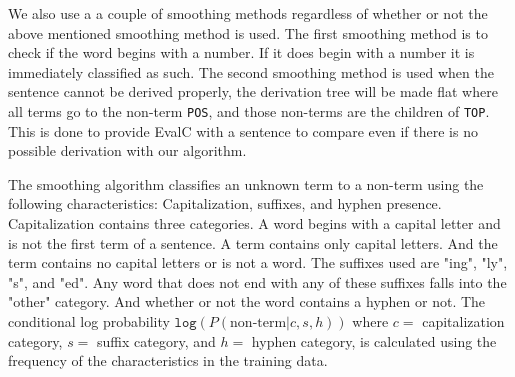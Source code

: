\documentclass[11pt,twocolumn]{article}
\begin{document}
We also use a a couple of smoothing methods regardless of whether or not the above mentioned smoothing method is used. The first smoothing method is to check if the word begins with a number. If it does begin with a number it is immediately classified as such. The second smoothing method is used when the sentence cannot be derived properly, the derivation tree will be made flat where all terms go to the non-term \texttt{POS}, and those non-terms are the children of \texttt{TOP}. This is done to provide EvalC with a sentence to compare even if there is no possible derivation with our algorithm.

The smoothing algorithm classifies an unknown term to a non-term using the following characteristics: Capitalization, suffixes, and hyphen presence. 
Capitalization contains three categories. A word begins with a capital letter and is not the first term of a sentence. A term contains only capital letters. And the term contains no capital letters or is not a word.
The suffixes used are "ing", "ly", "s", and "ed". Any word that does not end with any of these suffixes falls into the "other" category.
And whether or not the word contains a hyphen or not.
The conditional log probability $\texttt{log}(P (\text{non-term} | c, s, h))$ where $c=$ capitalization category, $s=$ suffix category, and $h=$ hyphen category, is calculated using the frequency of the characteristics in the training data.

\end{document}

